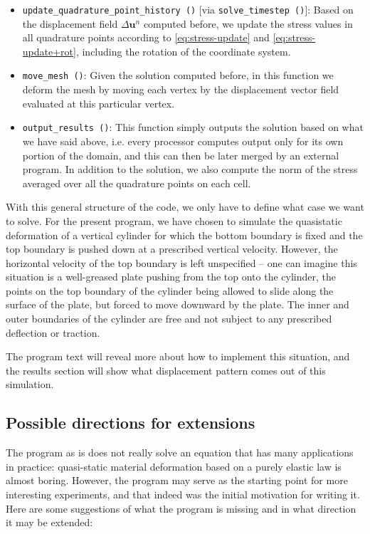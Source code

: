 \documentclass{article}
\renewcommand{\vec}[1]{\mathbf{#1}}
\begin{document}
\begin{itemize}
\item \texttt{update\_quadrature\_point\_history ()} [via
  \texttt{solve\_timestep ()}]: Based on the displacement field $\Delta \vec
  u^n$ computed before, we update the stress values in all quadrature points
  according to \eqref{eq:stress-update} and \eqref{eq:stress-update+rot},
  including the rotation of the coordinate system.

\item \texttt{move\_mesh ()}: Given the solution computed before, in this
  function we deform the mesh by moving each vertex by the displacement vector
  field evaluated at this particular vertex.

\item \texttt{output\_results ()}: This function simply outputs the solution
  based on what we have said above, i.e. every processor computes output only
  for its own portion of the domain, and this can then be later merged by an
  external program. In addition to the solution, we also compute the norm of
  the stress averaged over all the quadrature points on each cell.
\end{itemize}

With this general structure of the code, we only have to define what case
we want to solve. For the present program, we have chosen to simulate the
quasistatic deformation of a vertical cylinder for which the bottom boundary
is fixed and the top boundary is pushed down at a prescribed vertical
velocity. However, the horizontal velocity of the top boundary is left
unspecified -- one can imagine this situation is a well-greased plate pushing
from the top onto the cylinder, the points on the top boundary of the cylinder
being allowed to slide along the surface of the plate, but forced to move
downward by the plate. The inner and outer boundaries of the cylinder are free
and not subject to any prescribed deflection or traction.

The program text will reveal more about how to implement this situation, and
the results section will show what displacement pattern comes out of this
simulation. 

\subsection*{Possible directions for extensions}

The program as is does not really solve an equation that has many applications
in practice: quasi-static material deformation based on a purely elastic law
is almost boring. However, the program may serve as the starting point for
more interesting experiments, and that indeed was the initial motivation for
writing it. Here are some suggestions of what the program is missing and in
what direction it may be extended:
\end{document}
